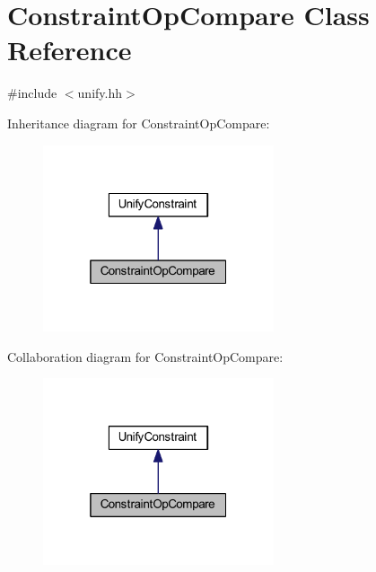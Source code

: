 \hypertarget{class_constraint_op_compare}{}\section{Constraint\+Op\+Compare Class Reference}
\label{class_constraint_op_compare}


{\ttfamily \#include $<$unify.\+hh$>$}



Inheritance diagram for Constraint\+Op\+Compare\+:
\nopagebreak
\begin{figure}[H]
\begin{center}
\leavevmode
\includegraphics[width=193pt]{class_constraint_op_compare__inherit__graph}
\end{center}
\end{figure}


Collaboration diagram for Constraint\+Op\+Compare\+:
\nopagebreak
\begin{figure}[H]
\begin{center}
\leavevmode
\includegraphics[width=193pt]{class_constraint_op_compare__coll__graph}
\end{center}
\end{figure}
